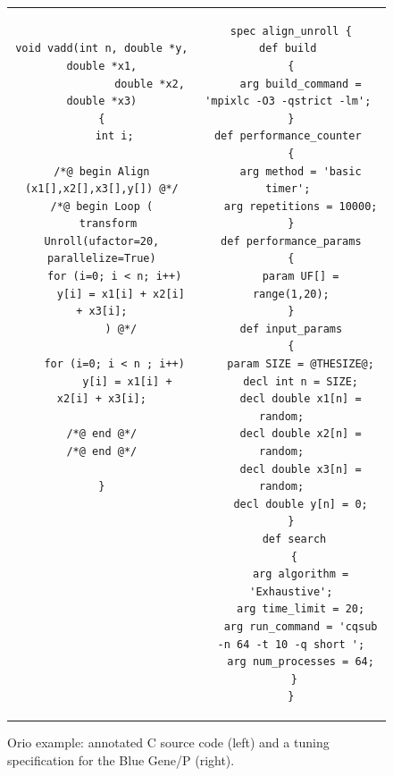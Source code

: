 \documentclass[11pt]{article}
\begin{document}
\begin{figure}[thp]
\centering
\begin{tabular}{cc}
\begin{minipage}[b]{.45\textwidth}
\scriptsize
\begin{verbatim}
void vadd(int n, double *y, double *x1,
               double *x2, double *x3)
{
    int i;

/*@ begin Align (x1[],x2[],x3[],y[]) @*/
/*@ begin Loop (
  transform Unroll(ufactor=20, parallelize=True)
    for (i=0; i < n; i++)
      y[i] = x1[i] + x2[i] + x3[i];
      ) @*/

    for (i=0; i < n ; i++)
        y[i] = x1[i] + x2[i] + x3[i];

/*@ end @*/
/*@ end @*/

}












\end{verbatim}
\end{minipage}
&
\begin{minipage}[b]{.45\textwidth}
\scriptsize
\begin{verbatim}
spec align_unroll {
 def build  
 { 
   arg build_command = 'mpixlc -O3 -qstrict -lm'; 
 } 
 def performance_counter  
 { 
   arg method = 'basic timer'; 
   arg repetitions = 10000;
 } 
 def performance_params 
 { 
   param UF[] = range(1,20);
 } 
 def input_params 
 { 
   param SIZE = @THESIZE@;
   decl int n = SIZE;
   decl double x1[n] = random;   
   decl double x2[n] = random;   
   decl double x3[n] = random;   
   decl double y[n] = 0;
 } 
 def search
 {
   arg algorithm = 'Exhaustive';
   arg time_limit = 20;
   arg run_command = 'cqsub -n 64 -t 10 -q short ';
   arg num_processes = 64;
 }
}
\end{verbatim}
\end{minipage}\\
\end{tabular}
\caption{Orio example: annotated C source code (left) and a tuning specification for the Blue Gene/P (right).}
\label{fig:orio-example}
\end{figure}
\end{document}
